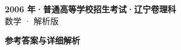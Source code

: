 \documentclass[zihao=-4, a4paper]{ctexart}
\begin{document}
\begin{center}
  {\Large\bfseries 2006 年·普通高等学校招生考试·辽宁卷理科}\\[4pt]
  {\large 数学 · 解析版}
\end{center}
\medskip
{}

\clearpage
{}
\begin{center}{\Large\bfseries 参考答案与详细解析}\end{center}
\medskip

\end{document}
